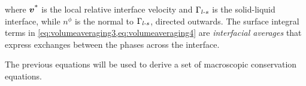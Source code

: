 where $\boldsymbol{v^\text{*}}$ is the local relative interface velocity and $\Gamma_{l\text{-}s}$ is the solid-liquid interface, 
while $n^\phi$ is the normal to $\Gamma_{l\text{-}s}$, directed outwards. The surface integral terms in 
\cref{eq:volumeaveraging3,eq:volumeaveraging4} are \emph{interfacial averages} 
that express exchanges between the phases across the interface. 

The previous equations will be used to derive a set of macroscopic conservation equations. 

